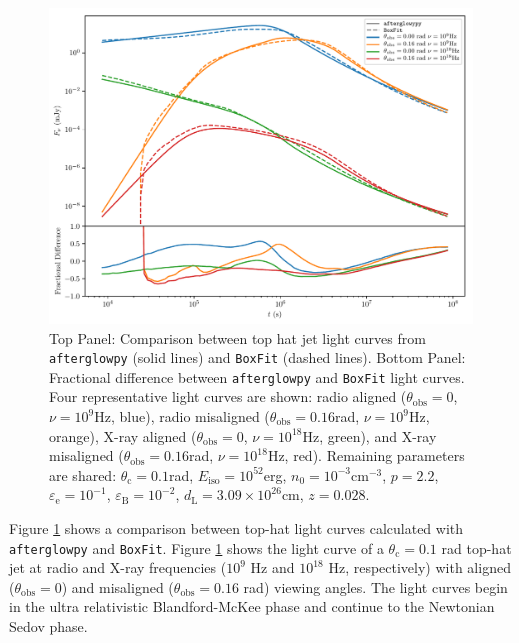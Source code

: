 \documentclass[twocolumn]{aastex62}
\newcommand{\afterglowpy}{{\tt afterglowpy}}
\newcommand{\boxfit}{{\tt BoxFit}}
\newcommand{\thobs}{\ensuremath{\theta_{\mathrm{obs}}}}
\newcommand{\thC}{\ensuremath{\theta_{\mathrm{c}}}}
\newcommand{\epse}{\ensuremath{\varepsilon_{\mathrm{e}}}}
\newcommand{\epsB}{\ensuremath{\varepsilon_{\mathrm{B}}}}
\newcommand{\dL}{\ensuremath{d_{\mathrm{L}}}}
\newcommand{\Eiso}{\ensuremath{E_{\mathrm{iso}}}}
\begin{document}
%
\begin{figure}
	\includegraphics[width=\textwidth]{figs/boxfit_comp.pdf}
	\caption{Top Panel: Comparison between top hat jet light curves from \afterglowpy{} (solid lines) and \boxfit{} (dashed lines). Bottom Panel: Fractional difference between \afterglowpy{} and \boxfit{} light curves.  Four representative light curves are shown: radio aligned ($\thobs=0$, $\nu=10^9$Hz, blue), radio misaligned ($\thobs=0.16$rad, $\nu=10^9$Hz, orange), X-ray aligned ($\thobs=0$, $\nu=10^{18}$Hz, green), and X-ray misaligned ($\thobs=0.16$rad, $\nu=10^{18}$Hz, red).  Remaining parameters are shared: $\thC=0.1$rad, $\Eiso=10^{52}$erg, $n_0 = 10^{-3}$cm$^{-3}$, $p=2.2$, $\epse=10^{-1}$, $\epsB=10^{-2}$, $\dL=3.09 \times 10^{26}$cm, $z=0.028$. \label{fig:boxfitComp}}
\end{figure}

Figure \ref{fig:boxfitComp} shows a comparison between top-hat light curves calculated with \afterglowpy{} and \boxfit{}.   Figure \ref{fig:boxfitComp} shows the light curve of a $\thC=0.1$ rad top-hat jet at radio and X-ray frequencies ($10^9$ Hz and $10^{18}$ Hz, respectively) with aligned ($\thobs = 0$) and misaligned ($\thobs=0.16$ rad) viewing angles.  The light curves begin in the ultra relativistic Blandford-McKee phase and continue to the Newtonian Sedov phase.
\end{document}
